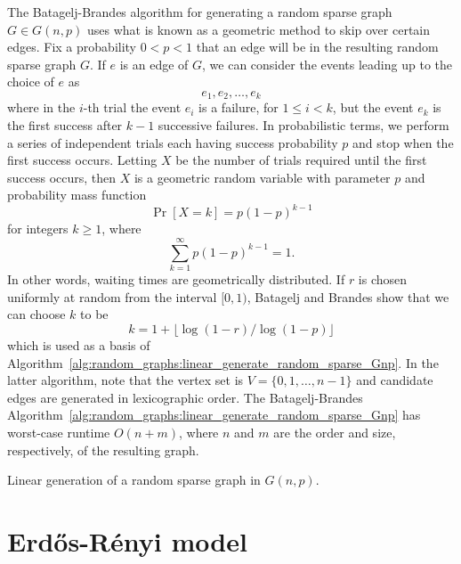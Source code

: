 The Batagelj-Brandes algorithm for
generating a random sparse graph $G \in G(n,p)$ uses what is known as
a geometric method to skip over certain edges. Fix a probability
$0 < p < 1$ that an edge will be in the resulting random sparse graph
$G$. If $e$ is an edge of $G$, we can consider the events leading up
to the choice of $e$ as
\[
e_1, e_2, \dots, e_k
\]
where in the $i$-th trial the event $e_i$ is a failure, for
$1 \leq i < k$, but the event $e_k$ is the first success after
$k - 1$ successive failures. In probabilistic terms, we perform a
series of independent trials each having success probability $p$ and
stop when the first success occurs. Letting $X$ be the number of
trials required until the first success occurs, then $X$ is a
geometric random variable with parameter $p$ and probability mass
function
\begin{equation}
\label{eqn:random_graphs:probability_mass_function_geometric_distribution}
\Pr[X = k]
=
p (1 - p)^{k - 1}
\end{equation}
for integers $k \geq 1$, where
\[
\sum_{k=1}^\infty p (1 - p)^{k - 1}
=
1.
\]
In other words, waiting times are geometrically distributed. If
$r$ is chosen uniformly at random from the interval $[0,1)$,
Batagelj and Brandes show that we
can choose $k$ to be
\[
k
=
1 + \lfloor \log(1 - r) / \log(1 - p) \rfloor
\]
which is used as a basis of
Algorithm~\ref{alg:random_graphs:linear_generate_random_sparse_Gnp}. In
the latter algorithm, note that the vertex set is
$V = \{0, 1, \dots, n-1\}$ and candidate edges are generated in
lexicographic order. The Batagelj-Brandes
Algorithm~\ref{alg:random_graphs:linear_generate_random_sparse_Gnp}
has worst-case runtime $O(n + m)$, where $n$ and $m$ are the order and
size, respectively, of the resulting graph.

\begin{algorithm}[!htbp]

\caption{Linear generation of a random sparse graph in $G(n,p)$.}
\label{alg:random_graphs:linear_generate_random_sparse_Gnp}
\end{algorithm}



\section{Erd\H{o}s-R\'enyi model}
\label{sec:random_graphs:Erdos_Renyi_model}

